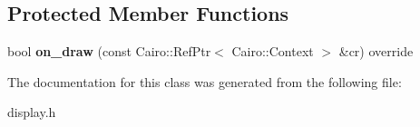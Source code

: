 \subsection*{Protected Member Functions}
\begin{DoxyCompactItemize}
\item 
bool {\bfseries on\+\_\+draw} (const Cairo\+::\+Ref\+Ptr$<$ Cairo\+::\+Context $>$ \&cr) override\hypertarget{classMyArea_af5d07988d7c9a6a623ba2fdd3332835b}{}\label{classMyArea_af5d07988d7c9a6a623ba2fdd3332835b}

\end{DoxyCompactItemize}


The documentation for this class was generated from the following file\+:\begin{DoxyCompactItemize}
\item 
display.\+h\end{DoxyCompactItemize}
